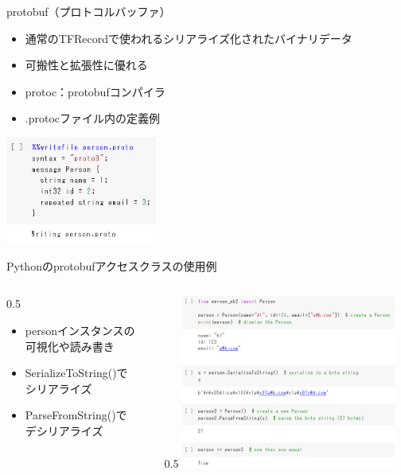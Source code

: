 \documentclass[aspectratio=169, dvipdfmx, 14pt, xcolor={svgnames,dvipsnames}, t]{beamer}
\newlength{\mytotalwidth}
\newlength{\mycolumnwidth}
\begin{document}
\begin{frame}{protobuf（プロトコルバッファ）}

  \begin{itemize}
    \tightlist
    \item
          通常のTFRecordで使われる\alert{シリアライズ化されたバイナリデータ}
    \item
          \alert{可搬性}と\alert{拡張性}に優れる
    \item
          protoc：protobufコンパイラ
    \item
          .protocファイル内の定義例
  \end{itemize}

  \centering
  \includegraphics[height=100pt]{img/hands-on-ml_13-2-2_1.png}

\end{frame}


\begin{frame}{Pythonのprotobufアクセスクラスの使用例}

  \begin{columns}[totalwidth=\mytotalwidth]
    \begin{column}[t]{0.5\mycolumnwidth}
      \begin{itemize}
        \tightlist
        \item
              personインスタンスの\\可視化や読み書き
        \item
              SerializeToString()で\\シリアライズ
        \item
              ParseFromString()で\\デシリアライズ
      \end{itemize}
    \end{column}

    \begin{column}[T]{0.5\mycolumnwidth}
      \centering
      \includegraphics[width=200pt]{img/hands-on-ml_13-2-2_2.png}
    \end{column}

  \end{columns}

\end{frame}
\end{document}
